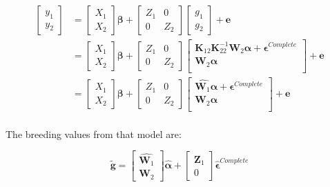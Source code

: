\documentclass[]{elsarticle} %
\begin{document}
\begin{align}
 \label{eq:entangled-augmented-single-step-model}
\begin{bmatrix}
  y_1 \\
  y_2 
 \end{bmatrix}
& =
 \begin{bmatrix}
  X_1 \\
  X_2 
 \end{bmatrix}
 \boldsymbol{\beta} + 
 \begin{bmatrix}
  Z_1 & 0 \\
  0 & Z_2 
 \end{bmatrix}
\begin{bmatrix}
  g_1 \\
  g_2 
 \end{bmatrix}
  + \mathbf{e} \\
    & = 
 \begin{bmatrix}
  X_1 \\
  X_2 
 \end{bmatrix}
 \boldsymbol{\beta} + 
 \begin{bmatrix}
  Z_1 & 0 \\
  0 & Z_2 
 \end{bmatrix}
\begin{bmatrix}
  \mathbf{K}_{12}\mathbf{K}_{22}^{-1}\mathbf{W}_2\boldsymbol{\alpha} + \boldsymbol{\epsilon}^{Complete}  \\
  \mathbf{W}_2\boldsymbol{\alpha} \\
 \end{bmatrix}
  + \mathbf{e} \\
    & = 
 \begin{bmatrix}
  X_1 \\
  X_2 
 \end{bmatrix}
 \boldsymbol{\beta} + 
 \begin{bmatrix}
  Z_1 & 0 \\
  0 & Z_2 
 \end{bmatrix}
\begin{bmatrix}
  \hat{\mathbf{W}_1}\boldsymbol{\alpha} + \boldsymbol{\epsilon}^{Complete} \\
  \mathbf{W}_2\boldsymbol{\alpha} \\
 \end{bmatrix}
  + \mathbf{e} \\
\end{align}

The breeding values from that model are:

\begin{equation}
 \label{eq:breeding-values}
\tilde{\mathbf{g}} = 
 \begin{bmatrix}
  \hat{\mathbf{W}_1} \\
  \mathbf{W}_2 
 \end{bmatrix}
 \hat{\boldsymbol{\alpha}}
 + 
 \begin{bmatrix}
  \mathbf{Z}_1 \\
  0
 \end{bmatrix}
 \hat{\boldsymbol{\epsilon}}^{Complete} 
\end{equation}
\end{document}
